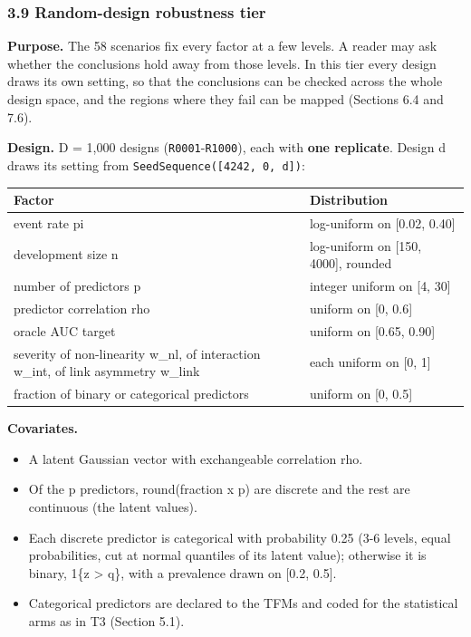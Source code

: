 \documentclass[
  10pt,
]{article}
\newcounter{none} %
\providecommand{\tightlist}{%
  \setlength{\itemsep}{0pt}\setlength{\parskip}{0pt}}
\begin{document}
\subsubsection{3.9 Random-design robustness
tier}\label{random-design-robustness-tier}

\textbf{Purpose.} The 58 scenarios fix every factor at a few
levels. A reader may ask whether the conclusions hold away
from those levels. In this tier every design draws its own
setting, so that the conclusions can be checked across the
whole design space, and the regions where they fail can be
mapped (Sections 6.4 and 7.6).

\textbf{Design.} D = 1,000 designs
(\texttt{R0001}-\texttt{R1000}), each with \textbf{one
replicate}. Design d draws its setting from
\texttt{SeedSequence({[}4242,\ 0,\ d{]})}:

{\def\LTcaptype{none} %
\begin{longtable}[]{@{}
  >{\raggedright\arraybackslash}p{}
  >{\raggedright\arraybackslash}p{}@{}}
\toprule\noalign{}
\begin{minipage}[b]{\linewidth}\raggedright
Factor
\end{minipage} & \begin{minipage}[b]{\linewidth}\raggedright
Distribution
\end{minipage} \\
\midrule\noalign{}
\endhead
\bottomrule\noalign{}
\endlastfoot
event rate pi & log-uniform on {[}0.02, 0.40{]} \\
development size n & log-uniform on {[}150, 4000{]},
rounded \\
number of predictors p & integer uniform on {[}4, 30{]} \\
predictor correlation rho & uniform on {[}0, 0.6{]} \\
oracle AUC target & uniform on {[}0.65, 0.90{]} \\
severity of non-linearity w\_nl, of interaction w\_int, of
link asymmetry w\_link & each uniform on {[}0, 1{]} \\
fraction of binary or categorical predictors & uniform on
{[}0, 0.5{]} \\
\end{longtable}
}

\textbf{Covariates.}

\begin{itemize}
\tightlist
\item
  A latent Gaussian vector with exchangeable correlation
  rho.
\item
  Of the p predictors, round(fraction x p) are discrete and
  the rest are continuous (the latent values).
\item
  Each discrete predictor is categorical with probability
  0.25 (3-6 levels, equal probabilities, cut at normal
  quantiles of its latent value); otherwise it is binary,
  1\{z \textgreater{} q\}, with a prevalence drawn on
  {[}0.2, 0.5{]}.
\item
  Categorical predictors are declared to the TFMs and coded
  for the statistical arms as in T3 (Section 5.1).
\end{itemize}
\end{document}
